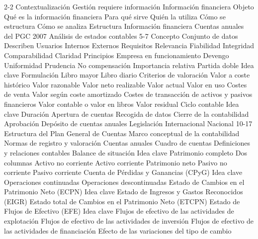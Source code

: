 \documentclass{nuevotema}
\begin{document}
\begin{esquema}[enumerate]
	\1[]  2-2
		\2 Contextualización
			\3 Gestión requiere información
			\3 Información financiera
		\2 Objeto
			\3 Qué es la información financiera
			\3 Para qué sirve
			\3 Quién la utiliza
			\3 Cómo se estructura
			\3 Cómo se analiza
		\2 Estructura
			\3 Información financiera
			\3 Cuentas anuales del PGC 2007
			\3 Análisis de estados contables
	\1  5-7
		\2 Concepto
			\3 Conjunto de datos
			\3 Describen
		\2 Usuarios
			\3 Internos
			\3 Externos
		\2 Requisitos
			\3 Relevancia
			\3 Fiabilidad
			\3 Integridad
			\3 Comparabilidad
			\3 Claridad
		\2 Principios
			\3 Empresa en funcionamiento
			\3 Devengo
			\3 Uniformidad
			\3 Prudencia
			\3 No compensación
			\3 Importancia relativa
		\2 Partida doble
			\3 Idea clave
			\3 Formulación
			\3 Libro mayor
			\3 Libro diario
		\2 Criterios de valoración
			\3 Valor a coste histórico
			\3 Valor razonable
			\3 Valor neto realizable
			\3 Valor actual
			\3 Valor en uso
			\3 Costes de venta
			\3 Valor según coste amortizado
			\3 Costes de transacción de activos y pasivos financieros
			\3 Valor contable o valor en libros
			\3 Valor residual
		\2 Ciclo contable
			\3 Idea clave
			\3 Duración
			\3 Apertura de cuentas
			\3 Recogida de datos
			\3 Cierre de la contabilidad
			\3 Aprobación
			\3 Depósito de cuentas anuales
		\2 Legislación
			\3 Internacional
			\3 Nacional
	\1  10-17
		\2 Estructura del Plan General de Cuentas
			\3[I] Marco conceptual de la contabilidad
			\3[II] Normas de registro y valoración
			\3[III] Cuentas anuales
			\3[IV] Cuadro de cuentas
			\3[V] Definiciones y relaciones contables
		\2[I] Balance de situación
			\3 Idea clave
			\3 Patrimonio completo
			\3 Dos columnas
			\3[i] Activo no corriente
			\3[ii] Activo corriente
			\3[i'] Patrimonio neto
			\3[ii'] Pasivo no corriente
			\3[iii'] Pasivo corriente
		\2[II] Cuenta de Pérdidas y Ganancias (CPyG)
			\3 Idea clave
			\3 Operaciones continuadas
			\3 Operaciones descontinuadas
		\2[III] Estado de Cambios en el Patrimonio Neto (ECPN)
			\3 Idea clave
			\3[i] Estado de Ingresos y Gastos Reconocidos (EIGR)
			\3[ii] Estado total de Cambios en el Patrimonio Neto (ETCPN)
		\2[IV] Estado de Flujos de Efectivo (EFE)
			\3 Idea clave
			\3[i] Flujos de efectivo de las actividades de explotación
			\3[ii] Flujos de efectivo de las actividades de inversión
			\3[iii] Flujos de efectivo de las actividades de financiación
			\3[iv] Efecto de las variaciones del tipo de cambio

\end{esquema}
\end{document}
